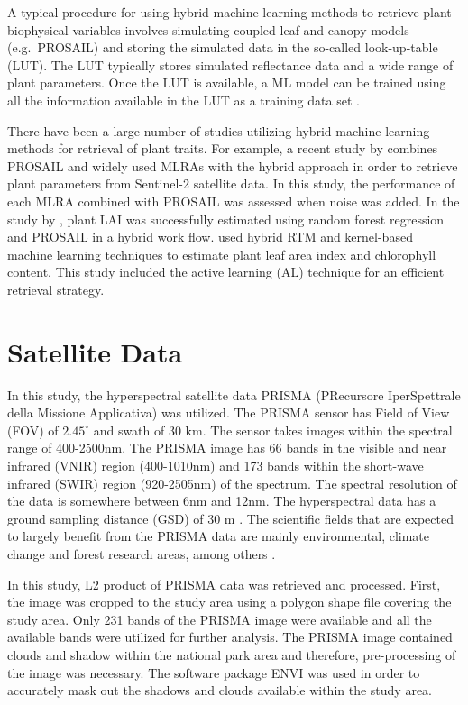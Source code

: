 \documentclass[a4paper, twoside]{templates/ociamthesis}
\begin{document}
A typical procedure for using hybrid machine learning methods to retrieve plant biophysical variables involves simulating coupled leaf and canopy models (e.g.~PROSAIL) and storing the simulated data in the so-called look-up-table (LUT). The LUT typically stores simulated reflectance data and a wide range of plant parameters. Once the LUT is available, a ML model can be trained using all the information available in the LUT as a training data set \citep{verrelst2019quantifying}.

There have been a large number of studies utilizing hybrid machine learning methods for retrieval of plant traits. For example, a recent study by \citet{cesar2021exploring} combines PROSAIL and widely used MLRAs with the hybrid approach in order to retrieve plant parameters from Sentinel-2 satellite data. In this study, the performance of each MLRA combined with PROSAIL was assessed when noise was added. In the study by \citet{wei2017estimation}, plant LAI was successfully estimated using random forest regression and PROSAIL in a hybrid work flow. \citet{verrelst2016active} used hybrid RTM and kernel-based machine learning techniques to estimate plant leaf area index and chlorophyll content. This study included the active learning (AL) technique for an efficient retrieval strategy.

\hypertarget{satellite-data}{%
\chapter{Satellite Data}\label{satellite-data}}

In this study, the hyperspectral satellite data PRISMA (PRecursore IperSpettrale della Missione Applicativa) was utilized. The PRISMA sensor has Field of View (FOV) of \(2.45^{\circ}\) and swath of 30 km. The sensor takes images within the spectral range of 400-2500nm. The PRISMA image has 66 bands in the visible and near infrared (VNIR) region (400-1010nm) and 173 bands within the short-wave infrared (SWIR) region (920-2505nm) of the spectrum. The spectral resolution of the data is somewhere between 6nm and 12nm. The hyperspectral data has a ground sampling distance (GSD) of 30 m \citep{candela2016prisma, giardino2020first, verrelst2021mapping}. The scientific fields that are expected to largely benefit from the PRISMA data are mainly environmental, climate change and forest research areas, among others \citep{giardino2020first}.

In this study, L2 product of PRISMA data was retrieved and processed. First, the image was cropped to the study area using a polygon shape file covering the study area. Only 231 bands of the PRISMA image were available and all the available bands were utilized for further analysis. The PRISMA image contained clouds and shadow within the national park area and therefore, pre-processing of the image was necessary. The software package ENVI was used in order to accurately mask out the shadows and clouds available within the study area.
\end{document}
